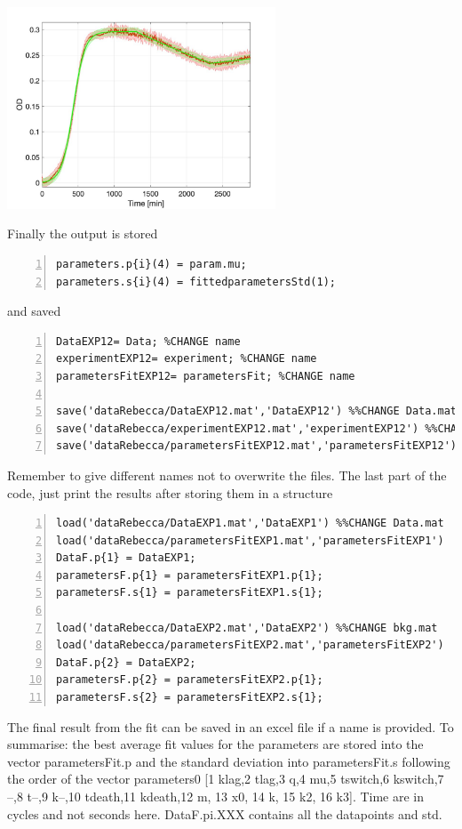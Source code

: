\documentclass{article}
\begin{document}
\begin{center}
\includegraphics[width=0.6\textwidth]{ex1}
\end{center}

Finally the output is stored
\begin{lstlisting}[frame=single,numbers=left,style=Matlab-Pyglike]
parameters.p{i}(4) = param.mu;
parameters.s{i}(4) = fittedparametersStd(1);
\end{lstlisting}
and saved
\begin{lstlisting}[frame=single,numbers=left,style=Matlab-Pyglike]
DataEXP12= Data; %CHANGE name
experimentEXP12= experiment; %CHANGE name
parametersFitEXP12= parametersFit; %CHANGE name

save('dataRebecca/DataEXP12.mat','DataEXP12') %%CHANGE Data.mat
save('dataRebecca/experimentEXP12.mat','experimentEXP12') %%CHANGE experiment.mat
save('dataRebecca/parametersFitEXP12.mat','parametersFitEXP12') %%CHANGE parametersFit.mat
\end{lstlisting}
Remember to give different names not to overwrite the files.
The last part of the code, just print the results after storing them in a structure
\begin{lstlisting}[frame=single,numbers=left,style=Matlab-Pyglike]
%load all the datasets to plot together
load('dataRebecca/DataEXP1.mat','DataEXP1') %%CHANGE Data.mat
load('dataRebecca/parametersFitEXP1.mat','parametersFitEXP1')  %%CHANGE parametersFit.mat
DataF.p{1} = DataEXP1;
parametersF.p{1} = parametersFitEXP1.p{1};
parametersF.s{1} = parametersFitEXP1.s{1};

load('dataRebecca/DataEXP2.mat','DataEXP2') %%CHANGE bkg.mat
load('dataRebecca/parametersFitEXP2.mat','parametersFitEXP2')  %%CHANGE parametersFit.mat
DataF.p{2} = DataEXP2;
parametersF.p{2} = parametersFitEXP2.p{1};
parametersF.s{2} = parametersFitEXP2.s{1};
\end{lstlisting}

The final result from the fit can be saved in an excel file if a name is provided. To summarise: the best average fit values for the parameters are stored into the vector parametersFit.p and the standard deviation into parametersFit.s following the order of the vector parameters0 [1 klag,2 tlag,3 q,4 mu,5 tswitch,6 kswitch,7 --,8 t--,9 k--,10 tdeath,11 kdeath,12 m, 13 x0, 14 k, 15 k2, 16 k3]. Time are in cycles and not seconds here. DataF.p{i}.XXX contains all the datapoints and std.
\end{document}
